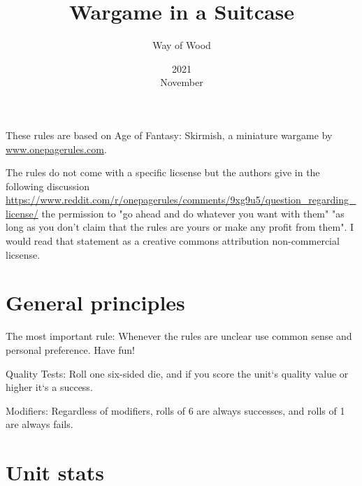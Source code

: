 \documentclass[6pt]{scrreport}
\title{Wargame in a Suitcase}
\date{2021\\ November}
\author{Way of Wood}
\begin{document}
\maketitle
\doclicenseThis

These rules are based on Age of Fantasy: Skirmish,  a miniature wargame
by \url{www.onepagerules.com}.

The rules do not come with a specific licsense but the authors give in the following
discussion \url{https://www.reddit.com/r/onepagerules/comments/9xg9u5/question_regarding_license/}
the permission to "go ahead and do whatever you want with them" "as long as you don't claim that the rules are yours or make any profit from them".
I would read that statement as a creative commons attribution non-commercial licsense.


\chapter*{General principles}

The most important rule: Whenever the
rules are unclear use common sense and
personal preference. Have fun!

Quality Tests: Roll one six-sided die,
and if you score the unit‘s quality value
or higher it‘s a success.

Modifiers: Regardless of modifiers, rolls
of 6 are always successes, and rolls of 1
are always fails.

\chapter*{Unit stats}
\end{document}
